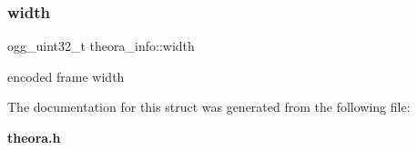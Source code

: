 \mbox{\label{structtheora__info_a17c2fc651bb3329f1ea6b13ff1d3957b}} 
\subsubsection{width}
{\footnotesize\ttfamily ogg\+\_\+uint32\+\_\+t theora\+\_\+info\+::width}



encoded frame width 



The documentation for this struct was generated from the following file\+:\begin{DoxyCompactItemize}
\item 
\textbf{ theora.\+h}\end{DoxyCompactItemize}
